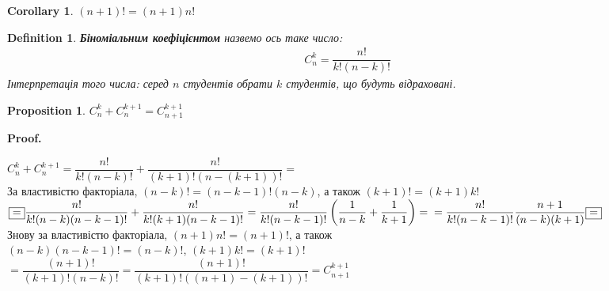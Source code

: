 \documentclass[a4paper, 14pt]{article}
\makeatletter
\def\qed{$\blacksquare$}
\theoremstyle{theoremdd}
\theoremstyle{theoremdd}
\newtheorem{definition}[theorem]{Definition}
\theoremstyle{theoremdd}
\theoremstyle{theoremdd}
\theoremstyle{theoremdd}
\newtheorem{proposition}[theorem]{Proposition}
\theoremstyle{theoremdd}
\theoremstyle{theoremdd}
\theoremstyle{theoremdd}
\newtheorem{corollary}[theorem]{Corollary}
\renewenvironment{proof}[1][Proof.\\]{\par
\pushQED{\hfill \qed}%
\normalfont \topsep6\p@\@plus6\p@\relax
\trivlist
\item\relax
{\bfseries
#1\@addpunct{.}}\hspace\labelsep\ignorespaces
}{%
\popQED\endtrivlist\@endpefalse
}
\makeatother
\begin{document}
	\begin{corollary} 
	$(n+1)! = (n+1)n!$
	\end{corollary}
	
	\begin{definition}
	\textbf{Біноміальним коефіцієнтом} назвемо ось таке число:
	\begin{align*}
	C_n^k = \dfrac{n!}{k!(n-k)!}
	\end{align*}
	Інтерпретація того числа: серед $n$ студентів обрати $k$ студентів, що будуть відраховані.
	\end{definition}

	\begin{proposition}
	$C_n^k + C_n^{k+1} = C_{n+1}^{k+1}$
	\end{proposition}
	
	\begin{proof}
	$C_n^k + C_n^{k+1} = \dfrac{n!}{k!(n-k)!} + \dfrac{n!}{(k+1)!(n-(k+1))!} \boxed{=}$\\
	За властивістю факторіала, $(n-k)! = (n-k-1)!(n-k)$, а також $(k+1)! = (k+1)k!$\\
	$\boxed{=} \dfrac{n!}{k!(n-k)(n-k-1)!} + \dfrac{n!}{k!(k+1)(n-k-1)!} = \dfrac{n!}{k!(n-k-1)!} \left(\dfrac{1}{n-k} + \dfrac{1}{k+1} \right) = \\ = \dfrac{n!}{k!(n-k-1)!} \dfrac{n+1}{(n-k)(k+1)} \boxed{=}$\\
	Знову за властивістю факторіала, $(n+1)n! = (n+1)!$, а також \\ $(n-k)(n-k-1)! = (n-k)!$, $(k+1)k! = (k+1)!$ \\
	$\boxed{=} \dfrac{(n+1)!}{(k+1)!(n-k)!} = \dfrac{(n+1)!}{(k+1)!((n+1)-(k+1))!} = C_{n+1}^{k+1}$
	\end{proof}
	
\end{document}
